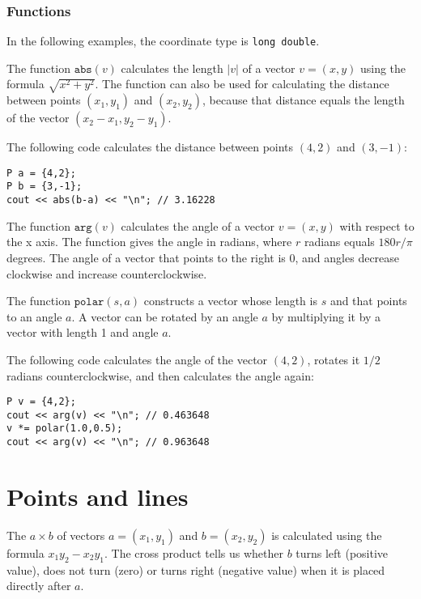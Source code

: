 \subsubsection*{Functions}

In the following examples, the coordinate type is
\texttt{long double}.

The function $\texttt{abs}(v)$ calculates the length
$|v|$ of a vector $v=(x,y)$
using the formula $\sqrt{x^2+y^2}$.
The function can also be used for
calculating the distance between points
$(x_1,y_1)$ and $(x_2,y_2)$,
because that distance equals the length
of the vector $(x_2-x_1,y_2-y_1)$.

The following code calculates the distance
between points $(4,2)$ and $(3,-1)$:
\begin{lstlisting}
P a = {4,2};
P b = {3,-1};
cout << abs(b-a) << "\n"; // 3.16228
\end{lstlisting}

The function $\texttt{arg}(v)$ calculates the
angle of a vector $v=(x,y)$ with respect to the x axis.
The function gives the angle in radians,
where $r$ radians equals $180 r/\pi$ degrees.
The angle of a vector that points to the right is 0,
and angles decrease clockwise and increase
counterclockwise.

The function $\texttt{polar}(s,a)$ constructs a vector
whose length is $s$ and that points to an angle $a$.
A vector can be rotated by an angle $a$
by multiplying it by a vector with length 1 and angle $a$.

The following code calculates the angle of
the vector $(4,2)$, rotates it $1/2$ radians
counterclockwise, and then calculates the angle again:

\begin{lstlisting}
P v = {4,2};
cout << arg(v) << "\n"; // 0.463648
v *= polar(1.0,0.5);
cout << arg(v) << "\n"; // 0.963648
\end{lstlisting}

\section{Points and lines}


The  $a \times b$ of vectors
$a=(x_1,y_1)$ and $b=(x_2,y_2)$ is calculated
using the formula $x_1 y_2 - x_2 y_1$.
The cross product tells us whether $b$
turns left (positive value), does not turn (zero)
or turns right (negative value)
when it is placed directly after $a$.

